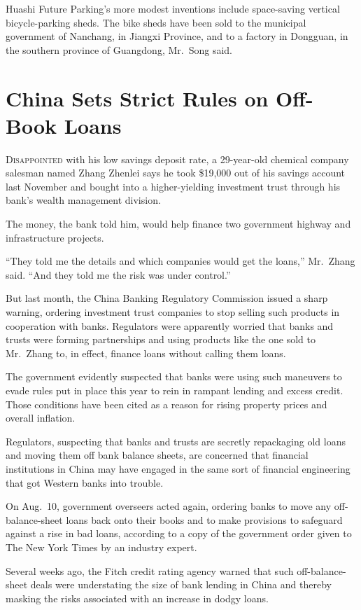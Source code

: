 ﻿\documentclass[12pt]{article}
\begin{document}
Huashi Future Parking's more modest inventions include space-saving vertical bicycle-parking sheds.
The bike sheds have been sold to the municipal government of Nanchang, in Jiangxi Province, and to a
factory in Dongguan, in the southern province of Guangdong, Mr.~Song said.

\section{China Sets Strict Rules on Off-Book Loans}

\lettrine{D}{isappointed} with his low savings deposit rate, a 29-year-old
chemical company salesman named Zhang Zhenlei says he took \$19,000 out of his savings account last
November and bought into a higher-yielding investment trust through his bank's wealth management
division.

The money, the bank told him, would help finance two government highway and infrastructure projects.

``They told me the details and which companies would get the loans,'' Mr.~Zhang said. ``And they
told me the risk was under control.''

But last month, the China Banking Regulatory Commission issued a sharp warning, ordering investment
trust companies to stop selling such products in cooperation with banks. Regulators were apparently
worried that banks and trusts were forming partnerships and using products like the one sold to
Mr.~Zhang to, in effect, finance loans without calling them loans.

The government evidently suspected that banks were using such maneuvers to evade rules put in place
this year to rein in rampant lending and excess credit. Those conditions have been cited as a reason
for rising property prices and overall inflation.

Regulators, suspecting that banks and trusts are secretly repackaging old loans and moving them off
bank balance sheets, are concerned that financial institutions in China may have engaged in the same
sort of financial engineering that got Western banks into trouble.

On Aug.~10, government overseers acted again, ordering banks to move any off-balance-sheet loans
back onto their books and to make provisions to safeguard against a rise in bad loans, according to
a copy of the government order given to The New York Times by an industry expert.

Several weeks ago, the Fitch credit rating agency warned that such off-balance-sheet deals were
understating the size of bank lending in China and thereby masking the risks associated with an
increase in dodgy loans.
\end{document}
